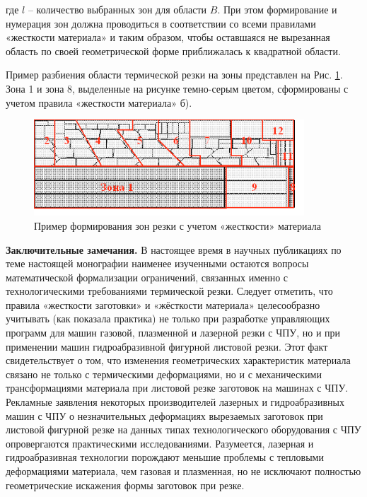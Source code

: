\documentclass[12pt,twoside]{report}
\begin{document}
где $l$
– количество выбранных зон для области $B$.
При этом формирование и нумерация зон
должна проводиться в соответствии со всеми правилами
«жесткости материала» и таким образом,
чтобы оставшаяся не вырезанная область
по своей геометрической форме приближалась к квадратной области.

Пример разбиения области термической резки на зоны
представлен на
Рис. \ref{zones}.
Зона 1 и зона 8,
выделенные на рисунке темно-серым цветом,
сформированы с учетом правила «жесткости материала» б).

\begin{figure}
  \begin{center}
  \includegraphics[width=0.9\textwidth]{zones.png}
  \caption{Пример формирования зон резки с учетом «жесткости» материала}
  \label{zones}
  \end{center}
\end{figure}

{\bf Заключительные замечания.}
В настоящее время в научных публикациях по теме настоящей монографии
наименее изученными остаются вопросы математической формализации ограничений,
связанных именно с технологическими требованиями термической резки.
Следует отметить, что правила «жесткости заготовки» и «жёсткости материала»
целесообразно учитывать (как показала практика)
не только при разработке управляющих программ для машин газовой,
плазменной и лазерной резки с ЧПУ,
но и при применении машин гидроабразивной фигурной листовой резки.
Этот факт свидетельствует о том,
что изменения геометрических характеристик материала
связано не только с термическими деформациями,
но и с механическими трансформациями материала
при листовой резке заготовок на машинах с ЧПУ.
Рекламные заявления некоторых производителей
лазерных и гидроабразивных машин с ЧПУ о незначительных
деформациях вырезаемых заготовок при листовой фигурной
резке на данных типах технологического оборудования с ЧПУ
опровергаются практическими исследованиями.
Разумеется, лазерная и гидроабразивная технологии
порождают меньшие проблемы с тепловыми деформациями материала,
чем газовая и плазменная,
но не исключают полностью геометрические искажения формы заготовок при резке.
\end{document}
